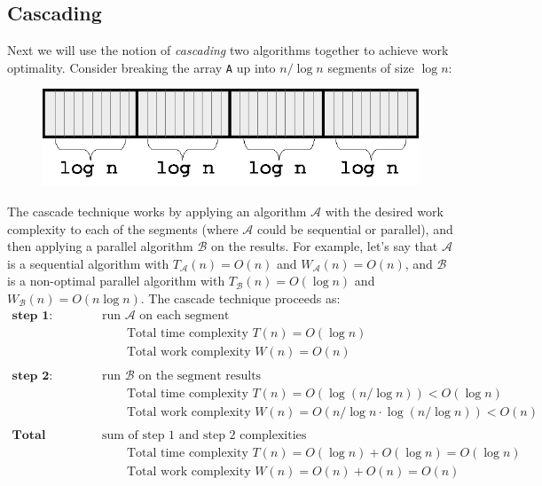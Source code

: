 \documentclass[twoside]{article}
\begin{document}
\subsection{Cascading}
Next we will use the notion of \textit{cascading} two algorithms together to achieve work optimality. Consider breaking the array \texttt{A} up into $n/\log n$ segments of size $\log n$:
\begin{figure}[h]
\center
\includegraphics[scale=1]{img/split_array}
\end{figure}

The cascade technique works by applying an algorithm $\mathcal{A}$ with the desired work complexity to each of the segments (where $\mathcal{A}$ could be sequential or parallel), and then applying a parallel algorithm $\mathcal{B}$ on the results. For example, let's say that $\mathcal{A}$ is a sequential algorithm with $T_{\mathcal{A}}(n) = O(n)$ and $W_{\mathcal{A}}(n) = O(n)$, and $\mathcal{B}$ is a non-optimal parallel algorithm with $T_{\mathcal{B}}(n) = O(\log n)$ and $W_{\mathcal{B}}(n) = O(n\log n)$. The cascade technique proceeds as:
\begin{align*}
\textbf{step 1: }& \text{run $\mathcal{A}$ on each segment}\\
& \qquad \text{Total time complexity } T(n) = O(\log n) \\
& \qquad \text{Total work complexity } W(n) = O(n)\\
&\\
\textbf{step 2: }& \text{run $\mathcal{B}$ on the segment results}\\
& \qquad \text{Total time complexity } T(n) = O(\log(n/\log n)) < O(\log n) \\
& \qquad \text{Total work complexity } W(n) = O(n/\log n \cdot \log(n/\log n)) < O(n)\\
\\
\textbf{Total Complexity: }& \text{sum of step 1 and step 2 complexities}\\
& \qquad \text{Total time complexity } T(n) = O(\log n) + O(\log n)  = O(\log n)\\
& \qquad \text{Total work complexity } W(n) = O(n) + O(n) = O(n)
\end{align*}
\end{document}
